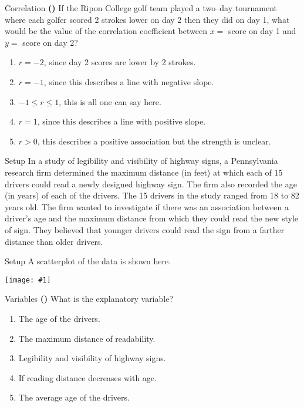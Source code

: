 \documentclass[13pt]{beamer}
\newcounter{count}
\newcommand{\question}{ \textbf{(\decimal{count})} \stepcounter{count}}
\newcommand{\pic}[2]{\hfill\texttt{[image: \#1]}\hspace*{\fill}}
\newenvironment{click}{\begin{enumerate}[A]}{\end{enumerate}}
\begin{document}
\begin{frame}{Correlation}
\question If the Ripon College golf team played a two--day tournament where each golfer scored 2 strokes lower on day 2 then they did on day 1, what would be the value of the correlation coefficient between $x =$ score on day 1 and $y =$ score on day 2?

\begin{click}
   \item $r = -2$, since day 2 scores are lower by 2 strokes.
   \item $r = -1$, since this describes a line with negative slope.
   \item $-1 \leq r \leq 1$, this is all one can say here.
   \item $r = 1$, since this describes a line with positive slope.%
   \item $r > 0$, this describes a positive association but the strength is unclear.
\end{click}
\end{frame}

\begin{frame}{Setup}
%
%
In a study of legibility and visibility of highway signs, a Pennsylvania research firm determined the maximum distance (in feet) at which each of 15 drivers could read a newly designed highway sign. The firm also recorded the age (in years) of each of the drivers. The 15 drivers in the study ranged from 18 to 82 years old. The firm wanted to investigate if there was an association between a driver's age and the maximum distance from which they could read the new style of sign. They believed that younger drivers could read the sign from a farther distance than older drivers.
\end{frame}

\begin{frame}{Setup}
%
%
A scatterplot of the data is shown here.
\begin{center}
\pic{highwayscatterplot.PNG}{1.0}
\end{center}
\end{frame}


\begin{frame}{Variables}
\question What is the explanatory variable?

\begin{click}
   \item The age of the drivers.%
   \item The maximum distance of readability.
   \item Legibility and visibility of highway signs.
   \item If reading distance decreases with age.
   \item The average age of the drivers.
\end{click}
\end{frame}
\end{document}
